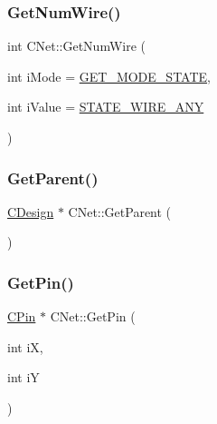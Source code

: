 \mbox{\label{classCNet_ae194cdbb585414b5eb533d0d097944b3}} 
\subsubsection{\texorpdfstring{GetNumWire()}{GetNumWire()}}
{\footnotesize\ttfamily int C\+Net\+::\+Get\+Num\+Wire (\begin{DoxyParamCaption}\item[{int}]{i\+Mode = {\ttfamily \mbox{\hyperlink{BoxRouter_8h_a6f72f2cc9dd31793dd832ccfb2547de4}{G\+E\+T\+\_\+\+M\+O\+D\+E\+\_\+\+S\+T\+A\+TE}}},  }\item[{int}]{i\+Value = {\ttfamily \mbox{\hyperlink{BoxRouter_8h_a1b285251edd87e1423189470586cc719}{S\+T\+A\+T\+E\+\_\+\+W\+I\+R\+E\+\_\+\+A\+NY}}} }\end{DoxyParamCaption})}

\mbox{\label{classCNet_a920188d5e3abdca198ad85d4299ea10d}} 
\subsubsection{\texorpdfstring{GetParent()}{GetParent()}}
{\footnotesize\ttfamily \mbox{\hyperlink{classCDesign}{C\+Design}} $\ast$ C\+Net\+::\+Get\+Parent (\begin{DoxyParamCaption}{ }\end{DoxyParamCaption})}

\mbox{\label{classCNet_ad0f4f9b80de19edb6731cda71fd450a7}} 
\subsubsection{\texorpdfstring{GetPin()}{GetPin()}\hspace{0.1cm}{\footnotesize\ttfamily [1/3]}}
{\footnotesize\ttfamily \mbox{\hyperlink{classCPin}{C\+Pin}} $\ast$ C\+Net\+::\+Get\+Pin (\begin{DoxyParamCaption}\item[{int}]{iX,  }\item[{int}]{iY }\end{DoxyParamCaption})}

\mbox{\label{classCNet_a3af1e1df7ab2044f1ad50bc460e84f9c}} 
